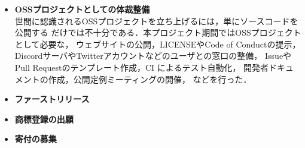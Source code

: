 \begin{itemize}
      \item \textbf{OSSプロジェクトとしての体裁整備} \\
            世間に認識されるOSSプロジェクトを立ち上げるには，単にソースコードを公開する
            だけでは不十分である．本プロジェクト期間ではOSSプロジェクトとして必要な，
            ウェブサイトの公開，LICENSEやCode of Conductの提示，
            DiscordサーバやTwitterアカウントなどのユーザとの窓口の整備，
            IssueやPull Requestのテンプレート作成，CI によるテスト自動化，
            開発者ドキュメントの作成，公開定例ミーティングの開催，
            などを行った．
      \item \textbf{ファーストリリース} \\
      \item \textbf{商標登録の出願} \\
      \item \textbf{寄付の募集} \\
\end{itemize}
